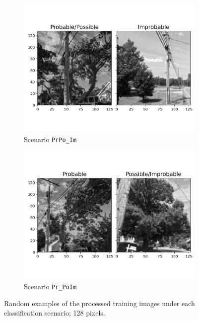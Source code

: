 \documentclass[Journal,letterpaper, SingleSpace, InsideFigs]{ascelike-new}
\begin{document}
\begin{figure}[h!]
  \begin{subfigure}[t]{.5\linewidth}
    \centering
    \includegraphics[width=\linewidth, trim={0 3cm 0 2cm}, clip]{processed_input_images_PrPo_Im_128_px}
    \caption{Scenario \texttt{PrPo\_Im}}
    \label{prpo_im_64}
  \end{subfigure}%
  \begin{subfigure}[t]{.5\linewidth}
    \centering
    \includegraphics[width=\linewidth, trim={0 3cm 0 2cm}, clip]{processed_input_images_Pr_PoIm_128_px}
    \caption{Scenario \texttt{Pr\_PoIm}}
    \label{pr_poim_64}
  \end{subfigure}%

  \caption{Random examples of the processed training images under each classification scenario; 128 pixels.}
  \label{fig:processed_images}
\end{figure}
\end{document}
